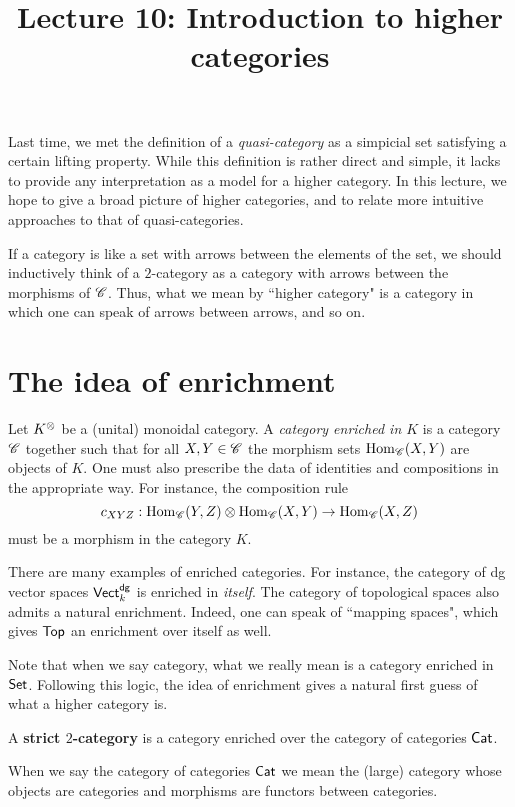 \documentclass[11pt]{amsart}
\title{Lecture 10: Introduction to higher categories}
\def\Top{{\sf Top}}
\def\Cat{{\sf Cat}}
\begin{document}
\maketitle

Last time, we met the definition of a {\em quasi-category} as a simpicial set satisfying a certain lifting property.
While this definition is rather direct and simple, it lacks to provide any interpretation as a model for a higher category.
In this lecture, we hope to give a broad picture of higher categories, and to relate more intuitive approaches to that of quasi-categories. 

If a category is like a set with arrows between the elements of the set, we should inductively think of a $2$-category as a category with arrows between the morphisms of $\mathscr C$.
Thus, what we mean by ``higher category" is a category in which one can speak of arrows between arrows, and so on. 

\section{The idea of enrichment}

Let $K^{\otimes}$ be a (unital) monoidal category.
A {\em category enriched in $K$} is a category $\mathscr C$ together such that for all $X,Y \in \mathscr C$ the morphism sets ${\rm Hom}_{\mathscr C}(X,Y)$ are objects of $K$. 
One must also prescribe the data of identities and compositions in the appropriate way.
For instance, the composition rule
\[
c_{XYZ} : {\rm Hom}_{\mathscr C}(Y,Z) \otimes {\rm Hom}_{\mathscr C}(X,Y) \to {\rm Hom}_{\mathscr C}(X,Z)
\]
must be a morphism in the category $K$. 

\begin{eg}
There are many examples of enriched categories. 
For instance, the category of dg vector spaces ${\sf Vect}^{\sf dg}_k$ is enriched in {\em itself}.
The category of topological spaces also admits a natural enrichment.
Indeed, one can speak of ``mapping spaces", which gives $\Top$ an enrichment over itself as well. 
\end{eg}

Note that when we say category, what we really mean is a category enriched in ${\sf Set}$. 
Following this logic, the idea of enrichment gives a natural first guess of what a higher category is. 

\begin{dfn}
A {\bf strict $2$-category} is a category enriched over the category of categories $\Cat$. 
\end{dfn}

\begin{rmk}
When we say the category of categories $\Cat$ we mean the (large) category whose objects are categories and morphisms are functors between categories.
\end{rmk}
\end{document}
